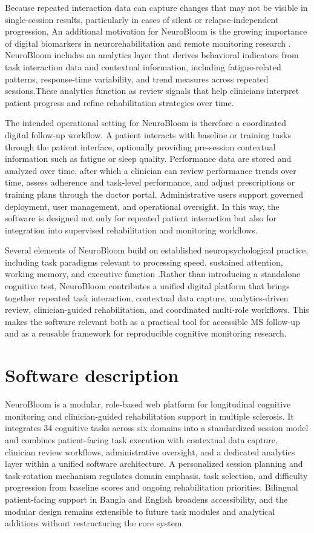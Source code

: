 \documentclass[preprint,12pt,a4paper]{elsarticle}
\begin{document}
Because repeated interaction data can capture changes that may not be visible in single-session results, particularly in cases of silent or relapse-independent progression, An additional motivation for NeuroBloom is the growing importance of digital biomarkers in neurorehabilitation and remote monitoring research \cite{insel2017,coravos2019,dorsey2017}. NeuroBloom includes an analytics layer that derives behavioral indicators from task interaction data and contextual information, including fatigue-related patterns, response-time variability, and trend measures across repeated sessions.These analytics function as review signals that help clinicians interpret patient progress and refine rehabilitation strategies over time.

The intended operational setting for NeuroBloom is therefore a coordinated digital follow-up workflow. A patient interacts with baseline or training tasks through the patient interface, optionally providing pre-session contextual information such as fatigue or sleep quality. Performance data are stored and analyzed over time, after which a clinician can review performance trends over time, assess adherence and task-level performance, and adjust prescriptions or training plans through the doctor portal. Administrative users support governed deployment, user management, and operational oversight. In this way, the software is designed not only for repeated patient interaction but also for integration into supervised rehabilitation and monitoring workflows.

Several elements of NeuroBloom build on established neuropsychological practice, including task paradigms relevant to processing speed, sustained attention, working memory, and executive function \cite{benedict2012,kalb2018}.Rather than introducing a standalone cognitive test, NeuroBloom contributes a unified digital platform that brings together repeated task interaction, contextual data capture, analytics-driven review, clinician-guided rehabilitation, and coordinated multi-role workflows. This makes the software relevant both as a practical tool for accessible MS follow-up and as a reusable framework for reproducible cognitive monitoring research.

\section{Software description}

NeuroBloom is a modular, role-based web platform for longitudinal cognitive monitoring and clinician-guided rehabilitation support in multiple sclerosis. It integrates 34 cognitive tasks across six domains into a standardized session model and combines patient-facing task execution with contextual data capture, clinician review workflows, administrative oversight, and a dedicated analytics layer within a unified software architecture. A personalized session planning and task-rotation mechanism regulates domain emphasis, task selection, and difficulty progression from baseline scores and ongoing rehabilitation priorities. Bilingual patient-facing support in Bangla and English broadens accessibility, and the modular design remains extensible to future task modules and analytical additions without restructuring the core system.
\end{document}
